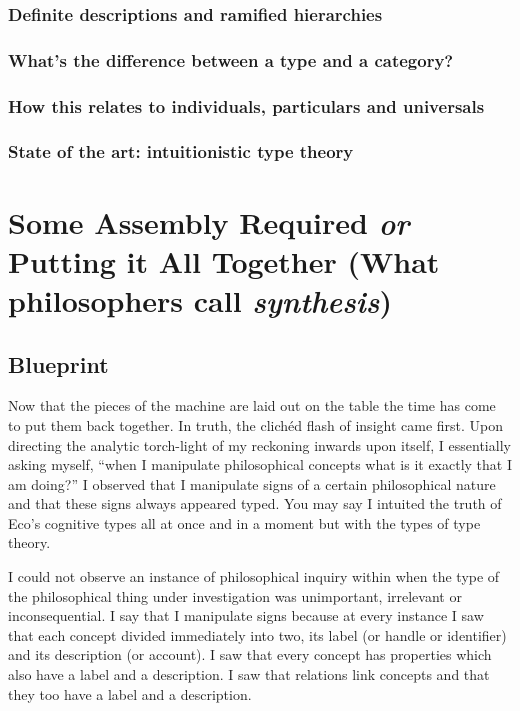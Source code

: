 \documentclass[dah,phd,a4paper]{xe_uccthesis}
\begin{document}
\lipsum[84]

\subsection{Definite descriptions and ramified hierarchies}

\lipsum[85]

\subsection{What's the difference between a type and a category?}

\lipsum[86]

\subsection{How this relates to individuals, particulars and universals}

\lipsum[87]

\subsection{State of the art: intuitionistic type theory}

\lipsum[88]

\chapter{Some Assembly Required \emph{or} Putting it All Together (What philosophers call \emph{synthesis})}

\section{Blueprint}

Now that the pieces of the machine are laid out on the table the time has come to put them back together. In truth, the clichéd flash of insight came first. Upon directing the analytic torch-light of my reckoning inwards upon itself, I essentially asking myself, “when I manipulate philosophical concepts what is it exactly that I am doing?” I observed that I manipulate signs of a certain philosophical nature and that these signs always appeared typed. You may say I intuited the truth of Eco's cognitive types\citep[ch. 3]{eco_kant_2000} all at once and in a moment but with the types of type theory\citep{coquand_type_2015}.

I could not observe an instance of philosophical inquiry within when the type of the philosophical thing under investigation was unimportant, irrelevant or inconsequential. I say that I manipulate signs because at every instance I saw that each concept divided immediately into two, its label (or handle or identifier) and its description (or account). I saw that every concept has properties which also have a label and a description. I saw that relations link concepts and that they too have a label and a description.
\end{document}
